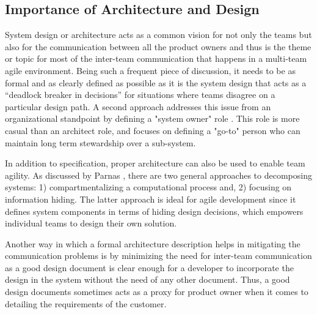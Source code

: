 \subsection{Importance of Architecture and Design}\label{sec:imp_of_dsgn}

System design or architecture acts as a common vision for not only the teams but also for the communication between all the product owners and thus is the theme or topic for most of the inter-team communication that happens in a multi-team agile environment.
Being such a frequent piece of discussion, it needs to be as formal and as clearly defined as possible as it is the system design that acts as a “deadlock breaker in decisions” \cite{architecureRole_article} for situations where teams disagree on a particular design path.
A second approach addresses this issue from an organizational standpoint by defining a "system owner" role \cite{kniberg12}.
This role is more casual than an architect role, and focuses on defining a "go-to" person who can maintain long term stewardship over a sub-system. 

In addition to specification, proper architecture can also be used to enable team agility.
As discussed by Parnas \cite{Parnas72}, there are two general approaches to decomposing systems: 1) compartmentalizing a computational process and, 2) focusing on information hiding.
The latter approach is ideal for agile development since it defines system components in terms of hiding design decisions, which empowers individual teams to design their own solution.

Another way in which a formal architecture description helps in mitigating the communication problems is by minimizing the need for inter-team communication as a good design document is clear enough for a developer to incorporate the design in the system without the need of any other document.
Thus, a good design documents sometimes acts as a proxy for product owner when it comes to detailing the requirements of the customer. 